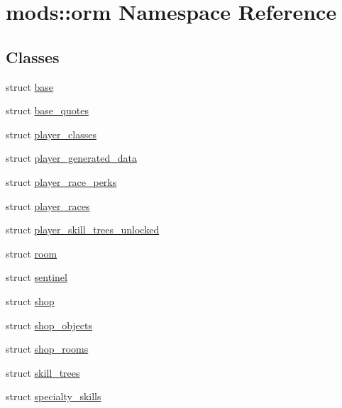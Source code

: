\hypertarget{namespacemods_1_1orm}{}\section{mods\+:\+:orm Namespace Reference}
\label{namespacemods_1_1orm}
\subsection*{Classes}
\begin{DoxyCompactItemize}
\item 
struct \hyperlink{structmods_1_1orm_1_1base}{base}
\item 
struct \hyperlink{structmods_1_1orm_1_1base__quotes}{base\+\_\+quotes}
\item 
struct \hyperlink{structmods_1_1orm_1_1player__classes}{player\+\_\+classes}
\item 
struct \hyperlink{structmods_1_1orm_1_1player__generated__data}{player\+\_\+generated\+\_\+data}
\item 
struct \hyperlink{structmods_1_1orm_1_1player__race__perks}{player\+\_\+race\+\_\+perks}
\item 
struct \hyperlink{structmods_1_1orm_1_1player__races}{player\+\_\+races}
\item 
struct \hyperlink{structmods_1_1orm_1_1player__skill__trees__unlocked}{player\+\_\+skill\+\_\+trees\+\_\+unlocked}
\item 
struct \hyperlink{structmods_1_1orm_1_1room}{room}
\item 
struct \hyperlink{structmods_1_1orm_1_1sentinel}{sentinel}
\item 
struct \hyperlink{structmods_1_1orm_1_1shop}{shop}
\item 
struct \hyperlink{structmods_1_1orm_1_1shop__objects}{shop\+\_\+objects}
\item 
struct \hyperlink{structmods_1_1orm_1_1shop__rooms}{shop\+\_\+rooms}
\item 
struct \hyperlink{structmods_1_1orm_1_1skill__trees}{skill\+\_\+trees}
\item 
struct \hyperlink{structmods_1_1orm_1_1specialty__skills}{specialty\+\_\+skills}
\end{DoxyCompactItemize}
